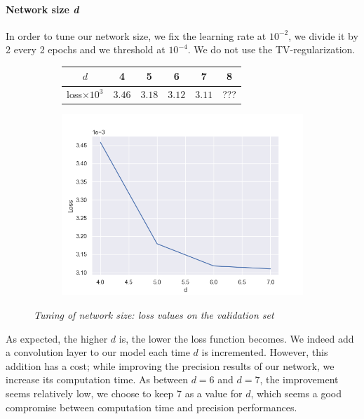 \documentclass{article}
\begin{document}
        \paragraph{Network size \textit{d}}
        \label{par:hpp-d}
        In order to tune our network size, we fix the learning rate at $10^{-2}$, we divide it by 2 every 2 epochs and we threshold at $10^{-4}$. We do not use the TV-regularization.

        \begin{figure}[!ht]
            \begin{subfigure}{.4\linewidth}
                \centering
                \begin{tabular}{|c|c|c|c|c|c|}
                    \hline
                    $d$ & 4 & 5 & 6 & 7 & 8 \\
                    \hline \hline
                    loss$\times 10^3$ & $3.46$ & $3.18$ & $3.12$ & $3.11$ & ??? \\
                    \hline
                \end{tabular}
            \end{subfigure}
            \begin{subfigure}{.59\linewidth}
                \centering
                \includegraphics[width=.8\linewidth]{pics/hpp-d.png}
            \end{subfigure}
            \caption{\textit{Tuning of network size: loss values on the validation set}}
        \end{figure}
        \par
        As expected, the higher $d$ is, the lower the loss function becomes. We indeed add a convolution layer to our model each time $d$ is incremented. However, this addition has a cost; while improving the precision results of our network, we increase its computation time. As between $d=6$ and $d=7$, the improvement seems relatively low, we choose to keep 7 as a value for $d$, which seems a good compromise between computation time and precision performances.
\end{document}
